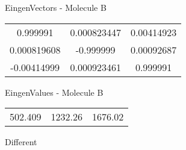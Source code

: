 \begin{multicols}{2}
\begin{center}
\vtab
 EingenVectors - Molecule B     \\
\vtab
\begin{tabular}{|c c c|}
0.999991	 & 	0.000823447	 & 	0.00414923	 \\
0.000819608	 & 	-0.999999	 & 	0.00092687	 \\
-0.00414999	 & 	0.000923461	 & 	0.999991
\end{tabular}

\vtab
 EingenValues - Molecule B     \\
\vtab
\begin{tabular}{|c c c|}
502.409	 & 	1232.26	 & 	1676.02	 \\
\end{tabular}

\end{center}
\end{multicols}
\begin{center}
\vtab
\vtab
\textcolor{NavyBlue}{\Large Different}
\end{center}

 \newpage

